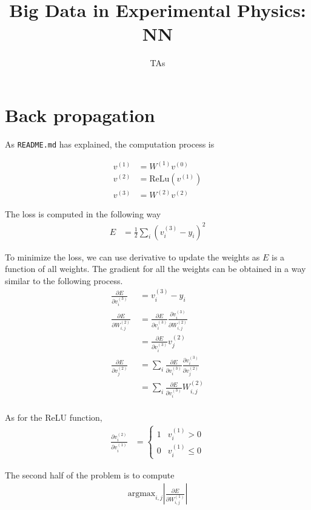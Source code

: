 \documentclass{article}
\title{\textbf{Big Data in Experimental Physics: NN}}
\author{TAs}
\begin{document}
\maketitle

\section{Back propagation}

As \texttt{README.md} has explained, the computation process is

\begin{align*}
  v^{(1)}&=W^{(1)}v^{(0)}\\
  v^{(2)}&=\text{ReLu}(v^{(1)})\\
  v^{(3)}&=W^{(2)}v^{(2)}
\end{align*}

The loss is computed in the following way
\begin{align*}
  E&=\frac{1}{2}\sum_{i}(v^{(3)}_i-y_i)^2
\end{align*}

\newcommand{\pfrac}[2]{\frac{\partial #1}{\partial #2}}

To minimize the loss, we can use derivative to update the weights as $E$ is a function of all weights. The gradient for all the weights can be obtained in a way similar to the following process.
\begin{align*}
  \pfrac{E}{v^{(3)}_i}&=v^{(3)}_i-y_i\\
  \pfrac{E}{W^{(2)}_{i,j}}\
  &=\pfrac{E}{v^{(3)}_i}\pfrac{v^{(3)}_i}{W^{(2)}_{i,j}}\\
  &=\pfrac{E}{v^{(3)}_i}v^{(2)}_j\\
  \pfrac{E}{v^{(2)}_j}
  &=\sum_i\pfrac{E}{v^{(3)}_i}\pfrac{v^{(3)}_i}{v^{(2)}_{j}}\\
  &=\sum_i\pfrac{E}{v^{(3)}_i}W^{(2)}_{i,j}\\
\end{align*}

As for the ReLU function,
\begin{align*}
  \pfrac{v^{(2)}_i}{v^{(1)}_i}
  &=\left\{
    \begin{array}{ll}
      1 & v^{(1)}_i>0\\
      0 & v^{(1)}_i\leq 0
    \end{array}
    \right.
\end{align*}

The second half of the problem is to compute
\begin{align*}
  \text{argmax}_{i,j}\left|\pfrac{E}{W^{(1)}_{i,j}}\right|
\end{align*}
\end{document}
